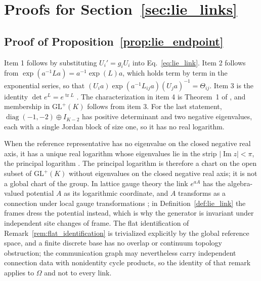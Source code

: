 \documentclass[twoside,11pt]{article}
\begin{document}

\section{Proofs for Section~\ref{sec:lie_links}}
\label{app:proofs_links}

\subsection{Proof of Proposition~\ref{prop:lie_endpoint}}
\label{app:proof_lie_endpoint}

Item 1 follows by substituting $U_i'=g_iU_i$ into Eq.~\eqref{eq:lie_link}. Item 2 follows from $\exp(a^{-1}La)=a^{-1}\exp(L)a$, which holds term by term in the exponential series, so that $(U_ia)\exp(a^{-1}L_{ij}a)(U_ja)^{-1}=\Theta_{ij}$. Item 3 is the identity $\det e^{L}=e^{\operatorname{tr}L}$ \citep{Hall2015}. The characterization in item 4 is Theorem~1 of \citet{culver1966existence}, and membership in $\mathrm{GL}^+(K)$ follows from item 3. For the last statement, $\operatorname{diag}(-1,-2)\oplus I_{K-2}$ has positive determinant and two negative eigenvalues, each with a single Jordan block of size one, so it has no real logarithm.

When the reference representative has no eigenvalue on the closed negative real axis, it has a unique real logarithm whose eigenvalues lie in the strip $|\operatorname{Im}z|<\pi$, the principal logarithm \citep[Thm.~1.31]{Higham2008}. The principal logarithm is therefore a chart on the open subset of $\mathrm{GL}^+(K)$ without eigenvalues on the closed negative real axis; it is not a global chart of the group. In lattice gauge theory the link $e^{aA}$ has the algebra-valued potential $A$ as its logarithmic coordinate, and $A$ transforms as a connection under local gauge transformations \citep{Creutz1983}; in Definition~\ref{def:lie_link} the frames dress the potential instead, which is why the generator is invariant under independent site changes of frame. The flat identification of Remark~\ref{rem:flat_identification} is trivialized explicitly by the global reference space, and a finite discrete base has no overlap or continuum topology obstruction; the communication graph may nevertheless carry independent connection data with nonidentity cycle products, so the identity of that remark applies to $\Omega$ and not to every link.
\end{document}
